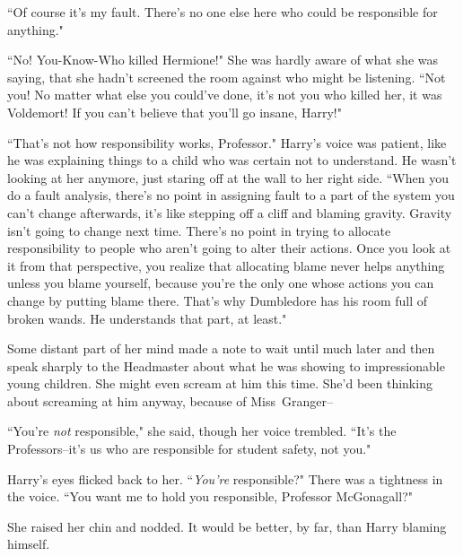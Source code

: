 ``Of course it's my fault. There's no one else here who could be responsible for anything."

``No! You-Know-Who killed Hermione!" She was hardly aware of what she was saying, that she hadn't screened the room against who might be listening. ``Not you! No matter what else you could've done, it's not you who killed her, it was Voldemort! If you can't believe that you'll go insane, Harry!"

``That's not how responsibility works, Professor." Harry's voice was patient, like he was explaining things to a child who was certain not to understand. He wasn't looking at her anymore, just staring off at the wall to her right side. ``When you do a fault analysis, there's no point in assigning fault to a part of the system you can't change afterwards, it's like stepping off a cliff and blaming gravity. Gravity isn't going to change next time. There's no point in trying to allocate responsibility to people who aren't going to alter their actions. Once you look at it from that perspective, you realize that allocating blame never helps anything unless you blame yourself, because you're the only one whose actions you can change by putting blame there. That's why Dumbledore has his room full of broken wands. He understands that part, at least."

Some distant part of her mind made a note to wait until much later and then speak sharply to the Headmaster about what he was showing to impressionable young children. She might even scream at him this time. She'd been thinking about screaming at him anyway, because of Miss~Granger\---

``You're \emph{not} responsible," she said, though her voice trembled. ``It's the Professors\---it's us who are responsible for student safety, not you."

Harry's eyes flicked back to her. ``\emph{You're} responsible?" There was a tightness in the voice. ``You want me to hold you responsible, Professor McGonagall?"

She raised her chin and nodded. It would be better, by far, than Harry blaming himself.

